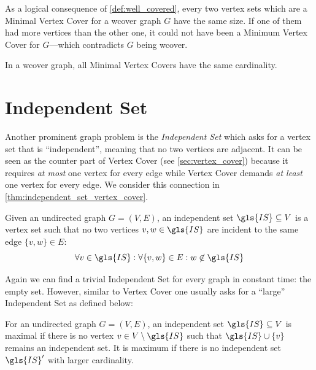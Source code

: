 As a logical consequence of \cref{def:well_covered}, every two vertex 
sets which are a Minimal Vertex Cover for a \gls{wcover} graph \(G\)
have the same size. If one of them had more vertices than the other
one, it could not have been a Minimum Vertex Cover for \(G\)---which
contradicts \(G\) being \gls{wcover}.

\begin{theorem}
  \label{thm:well_covered_vertex_cover}
  In a \gls{wcover} graph, all Minimal Vertex Covers have the same
  cardinality. \cite{graph_well_covered}
\end{theorem}

\section{Independent Set}
\label{sec:independent_set}
Another prominent graph problem is the \emph{Independent Set} which
asks for a vertex set that is ``independent'', meaning that no two
vertices are adjacent. It can be seen as the counter part of Vertex
Cover (see \cref{sec:vertex_cover}) because it requires \emph{at most}
one vertex for every edge while Vertex Cover demands \emph{at least}
one vertex for every edge. We consider this connection in 
\cref{thm:independent_set_vertex_cover}.

\begin{definition}
  \label{def:independent_set}
  Given an undirected graph \(G=(V,E)\), an independent set
  \(\gls{IS} \subseteq V\) is a vertex set such that no two
  vertices \(v,w \in \gls{IS}\) are incident to the same edge 
  \(\{v,w\} \in E\):
  \[
    \forall v \in \gls{IS}:
    \forall \{v,w\} \in E:
    w \not\in \gls{IS}
  \]
\end{definition}

Again we can find a trivial Independent Set for every graph in
constant time: the empty set. However, similar to Vertex Cover one 
usually asks for a ``large'' Independent Set as defined below:

\begin{definition}
  \label{def:max_independent_set}
  For an undirected graph \(G=(V,E)\), an independent set
  \(\gls{IS}\subseteq V\) is maximal if there is no vertex
  \(v \in V\setminus \gls{IS}\) such that
  \(\gls{IS} \cup \{v\}\) remains an independent set. It is
  maximum if there is no independent set \(\gls{IS}'\) with
  larger cardinality.
\end{definition}

